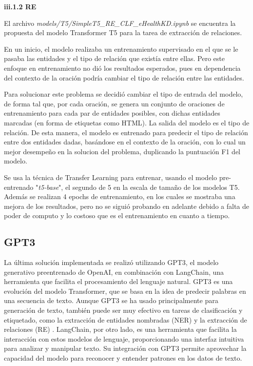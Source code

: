 \documentclass[10pt]{article} %
\begin{document}
	\vspace{0.5em}
	\textbf{iii.1.2 RE}
	\vspace{0.5em}
	
	El archivo \textit{models/T5/SimpleT5\_RE\_CLF\_eHealthKD.ipynb} se encuentra la propuesta del modelo Transformer T5 para la tarea de extracción de relaciones.
	 	
	En un inicio, el modelo realizaba un entrenamiento supervisado en el que se le pasaba las entidades y el tipo de relación que existía entre ellas. Pero este enfoque en entrenamiento no dió los resultados esperados, pues en dependencia del contexto de la oración podría cambiar el tipo de relación entre las entidades.
	
	Para solucionar este problema se decidió cambiar el tipo de entrada del modelo, de forma tal que, por cada oración, se genera un conjunto de oraciones de entrenamiento para cada par de entidades posibles, con dichas  entidades marcadas (en forma de etiquetas como HTML). La salida del modelo es el tipo de relación. De esta manera, el modelo es entrenado para predecir el tipo de relación entre dos entidades dadas, basándose en el contexto de la oración, con lo cual un mejor desempeño en la soluci\;on del problema, duplicando la puntuación F1 del modelo.
	
	Se usa la técnica de Transfer Learning para entrenar, usando el modelo pre-entrenado "\textit{t5-base}", el segundo de 5 en la escala de tamaño de los modelos T5. Además se realizan 4 epochs de entrenamiento, en los cuales se mostraba una mejora de los resultados, pero no se siguió probando en adelante debido a falta de poder de computo y lo costoso que es el entrenamiento en cuanto a tiempo.
	
	\subsection{GPT3}
	
	La \'ultima soluci\'on implementada se realiz\'o utilizando GPT3, el modelo generativo preentrenado de OpenAI, en combinación con LangChain, una herramienta que facilita el procesamiento del lenguaje natural. GPT3 es una evolución del modelo Transformer, que se basa en la idea de predecir palabras en una secuencia de texto. Aunque GPT3 se ha usado principalmente para generación de texto, también puede ser muy efectivo en tareas de clasificación y etiquetado, como la extracción de entidades nombradas (NER) y la extracción de relaciones (RE) \cite{gpt3}. LangChain, por otro lado, es una herramienta que facilita la interacción con estos modelos de lenguaje, proporcionando una interfaz intuitiva para analizar y manipular texto. Su integración con GPT3 permite aprovechar la capacidad del modelo para reconocer y entender patrones en los datos de texto.	
	
\end{document}
